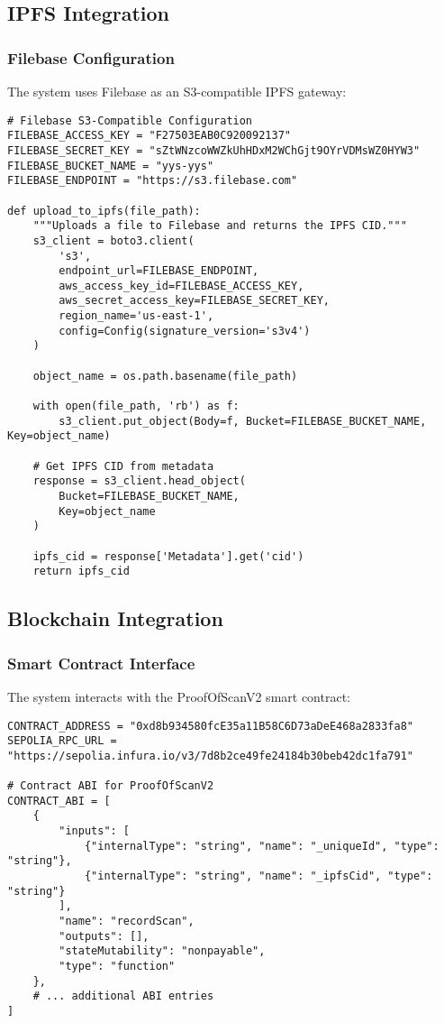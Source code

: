 \documentclass[12pt,a4paper]{article}
\begin{document}
\subsection{IPFS Integration}

\subsubsection{Filebase Configuration}

The system uses Filebase as an S3-compatible IPFS gateway:

\begin{lstlisting}[caption=IPFS Upload Configuration]
# Filebase S3-Compatible Configuration
FILEBASE_ACCESS_KEY = "F27503EAB0C920092137"
FILEBASE_SECRET_KEY = "sZtWNzcoWWZkUhHDxM2WChGjt9OYrVDMsWZ0HYW3"
FILEBASE_BUCKET_NAME = "yys-yys"
FILEBASE_ENDPOINT = "https://s3.filebase.com"

def upload_to_ipfs(file_path):
    """Uploads a file to Filebase and returns the IPFS CID."""
    s3_client = boto3.client(
        's3',
        endpoint_url=FILEBASE_ENDPOINT,
        aws_access_key_id=FILEBASE_ACCESS_KEY,
        aws_secret_access_key=FILEBASE_SECRET_KEY,
        region_name='us-east-1',
        config=Config(signature_version='s3v4')
    )
    
    object_name = os.path.basename(file_path)
    
    with open(file_path, 'rb') as f:
        s3_client.put_object(Body=f, Bucket=FILEBASE_BUCKET_NAME, Key=object_name)
    
    # Get IPFS CID from metadata
    response = s3_client.head_object(
        Bucket=FILEBASE_BUCKET_NAME,
        Key=object_name
    )
    
    ipfs_cid = response['Metadata'].get('cid')
    return ipfs_cid
\end{lstlisting}

\subsection{Blockchain Integration}

\subsubsection{Smart Contract Interface}

The system interacts with the ProofOfScanV2 smart contract:

\begin{lstlisting}[caption=Smart Contract Configuration]
CONTRACT_ADDRESS = "0xd8b934580fcE35a11B58C6D73aDeE468a2833fa8"
SEPOLIA_RPC_URL = "https://sepolia.infura.io/v3/7d8b2ce49fe24184b30beb42dc1fa791"

# Contract ABI for ProofOfScanV2
CONTRACT_ABI = [
    {
        "inputs": [
            {"internalType": "string", "name": "_uniqueId", "type": "string"},
            {"internalType": "string", "name": "_ipfsCid", "type": "string"}
        ],
        "name": "recordScan",
        "outputs": [],
        "stateMutability": "nonpayable",
        "type": "function"
    },
    # ... additional ABI entries
]
\end{lstlisting}
\end{document}
